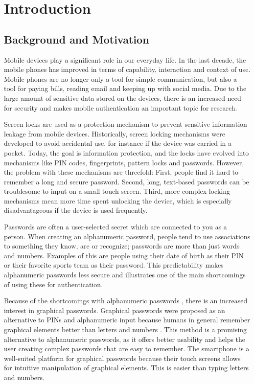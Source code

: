 \chapter{Introduction}\label{chap:introduction}
  
  \clearpage
  \section{Background and Motivation} \label{sec:backgroundandmotivation}
    Mobile devices play a significant role in our everyday life. In the last decade, the mobile phones has improved in terms of capability, interaction and context of use. Mobile phones are no longer only a tool for simple communication, but also a tool for paying bills, reading email and keeping up with social media. Due to the large amount of sensitive data stored on the devices, there is an increased need for security and makes mobile authentication an important topic for research.
    
    Screen locks are used as a protection mechanism to prevent sensitive information leakage from mobile devices. Historically, screen locking mechanisms were developed to avoid accidental use, for instance if the device was carried in a pocket. Today, the goal is information protection, and the locks have evolved into mechanisms like PIN codes, fingerprints, pattern locks and passwords. However, the problem with these mechanisms are threefold: First, people find it hard to remember a long and secure password. Second, long, text-based passwords can be troublesome to input on a small touch screen. Third, more complex locking mechanisms mean more time spent unlocking the device, which is especially disadvantageous if the device is used frequently.

    Passwords are often a user-selected secret which are connected to you as a person. When creating an alphanumeric password, people tend to use associations to something they know, are or recognize; passwords are more than just words and numbers. Examples of this are people using their date of birth as their PIN or their favorite sports team as their password. This predictability makes alphanumeric passwords less secure and illustrates one of the main shortcomings of using these for authentication.

    Because of the shortcomings with alphanumeric passwords \cite{UnixPasswords}, there is an increased interest in graphical passwords. Graphical passwords were proposed as an alternative to PINs and alphanumeric input because humans in general remember graphical elements better than letters and numbers \cite{DeAngeli}. This method is a promising alternative to alphanumeric passwords, as it offers better usability and helps the user creating complex passwords that are easy to remember. The smartphone is a well-suited platform for graphical passwords because their touch screens allows for intuitive manipulation of graphical elements. This is easier than typing letters and numbers. 
    
